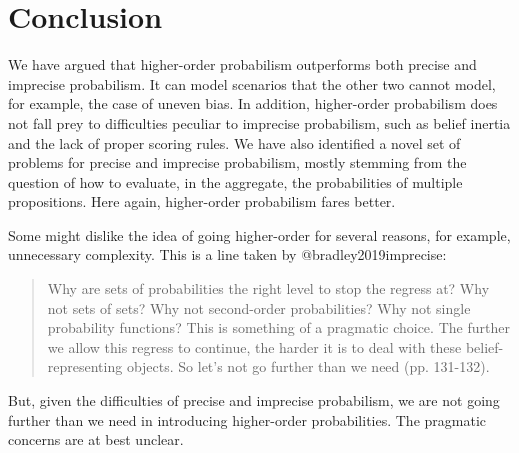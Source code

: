 \documentclass[
  letterpaper,
  DIV=11,
  numbers=noendperiod]{scrartcl}
\begin{document}
\section{Conclusion}\label{conclusion}

We have argued that higher-order probabilism outperforms both precise
and imprecise probabilism. It can model scenarios that the other two
cannot model, for example, the case of uneven bias. In addition,
higher-order probabilism does not fall prey to difficulties peculiar to
imprecise probabilism, such as belief inertia and the lack of proper
scoring rules. We have also identified a novel set of problems for
precise and imprecise probabilism, mostly stemming from the question of
how to evaluate, in the aggregate, the probabilities of multiple
propositions. Here again, higher-order probabilism fares better.

Some might dislike the idea of going higher-order for several reasons,
for example, unnecessary complexity. This is a line taken by
@bradley2019imprecise:

\begin{quote}
Why are sets of probabilities the right level to stop the regress at? Why not sets of sets? Why not second-order probabilities? Why not single probability functions? This is something of a pragmatic choice. The further we allow this regress to continue, the harder it is to deal with these belief-representing objects. So let's not go further than we need (pp. 131-132). \end{quote}

\noindent But, given the difficulties of precise and imprecise
probabilism, we are not going further than we need in introducing
higher-order probabilities. The pragmatic concerns are at best unclear.
\end{document}
